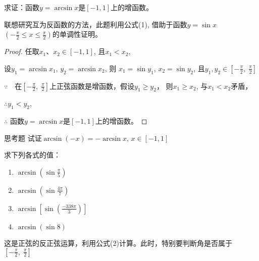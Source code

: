 \begin{example}
    求证：函数$y=\arcsin x$是$[-1,1]$上的增函数。
\end{example}

\begin{analyze}
    联想研究互为反函数的方法，此题利用公式(1), 借助于函数$y=\sin x$ $\left(-\frac{\pi}{2}\leq x\leq\frac{\pi}{2}\right)$的单调性证明。
\end{analyze}

\begin{proof}
    任取$x_1$、$x_2\in[-1,1]$, 且$x_1<x_2$,

    设$y_{1}= \arcsin x_{1}$, $y_{2}= \arcsin x_{2}$,
则 $x_{1}= \sin y_{1}$, $x_{2}= \sin y_{2}$, 且$y_1, y_{2}\in \left [ - \frac \pi 2, \;\frac \pi 2\right ] $

$\because\quad $在$\left[-\frac\pi2,\; \frac\pi2\right]$上正弦函数是增函数，假设$y_1\ge y_2$，
则$x_1\geqslant x_2$, 与$x_1<x_2$矛盾，

$\therefore y_{1}<y_{2}$,

$\therefore$ 函数$y=\arcsin x$是$[-1,1]$上的增函数。
\end{proof}

\begin{thm}
 {思考题} 试证$\arcsin(-x)=-\arcsin x$, $x\in[-1,1]$   
\end{thm}

\begin{example}
    求下列各式的值：
\begin{multicols}{2}
\begin{enumerate}[(1)]
    \item $\arcsin \left(\sin\frac{\pi}{5}\right)$
    \item $\arcsin \left(\sin\frac{4\pi}{7}\right)$
    \item $\arcsin \left[\sin\left(\frac{-338\pi}{3}\right)\right]$
    \item $\arcsin (\sin 8)$
\end{enumerate}
\end{multicols}
\end{example}

\begin{analyze}
 这是正弦的反正弦运算，利用公式(2)计算。此时，特别要判断角是否属于$\left[-\frac{\pi}{2},\; \frac{\pi}{2}\right]$
\end{analyze}

